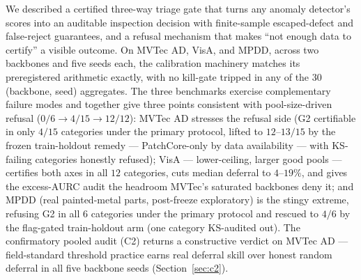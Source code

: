 \documentclass[11pt]{article}
\begin{document}
We described a certified three-way triage gate that turns any anomaly detector's scores into an
auditable inspection decision with finite-sample escaped-defect and false-reject guarantees, and a
refusal mechanism that makes ``not enough data to certify'' a visible outcome. On MVTec AD,
VisA, and MPDD, across two backbones and five seeds each, the calibration machinery matches its
preregistered arithmetic exactly, with no kill-gate tripped in any of the $30$ (backbone, seed)
aggregates. The three benchmarks exercise complementary failure modes and together give three
points consistent with pool-size-driven refusal ($0/6 \to 4/15 \to 12/12$): MVTec AD
stresses the refusal side (G2 certifiable in only $4/15$ categories under the primary protocol,
lifted to $12$--$13/15$ by the frozen train-holdout remedy --- PatchCore-only by data availability
--- with KS-failing categories honestly refused);
VisA --- lower-ceiling, larger good pools --- certifies both axes in all $12$ categories,
cuts median deferral to $4$--$19\%$, and gives the excess-AURC audit the headroom MVTec's
saturated backbones deny it; and MPDD (real painted-metal parts, post-freeze exploratory) is the
stingy extreme, refusing G2 in all $6$ categories under the primary protocol and rescued to $4/6$
by the flag-gated train-holdout arm (one category KS-audited out). The confirmatory pooled audit
(C2) returns a constructive verdict on
MVTec AD --- field-standard threshold practice earns real deferral skill over honest random deferral
in all five backbone seeds (Section~\ref{sec:c2}).
\end{document}
